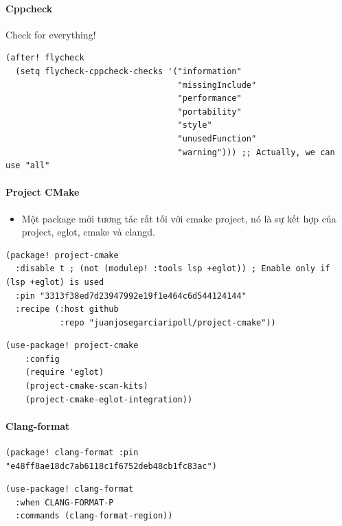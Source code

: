 \documentclass[11pt]{article}
\begin{document}
\paragraph{Cppcheck}
\label{sec:orge24f485}
Check for everything!

\begin{verbatim}
(after! flycheck
  (setq flycheck-cppcheck-checks '("information"
                                   "missingInclude"
                                   "performance"
                                   "portability"
                                   "style"
                                   "unusedFunction"
                                   "warning"))) ;; Actually, we can use "all"
\end{verbatim}

\paragraph{Project CMake}
\label{sec:orge6f52c6}
\begin{itemize}
\item Một package mới tương tác rất tối với cmake project, nó là sự kết hợp của
project, eglot, cmake và clangd.
\end{itemize}

\begin{verbatim}
(package! project-cmake
  :disable t ; (not (modulep! :tools lsp +eglot)) ; Enable only if (lsp +eglot) is used
  :pin "3313f38ed7d23947992e19f1e464c6d544124144"
  :recipe (:host github
           :repo "juanjosegarciaripoll/project-cmake"))
\end{verbatim}

\begin{verbatim}
(use-package! project-cmake
    :config
    (require 'eglot)
    (project-cmake-scan-kits)
    (project-cmake-eglot-integration))
\end{verbatim}

\paragraph{Clang-format}
\label{sec:orgf4dcdde}

\begin{verbatim}
(package! clang-format :pin "e48ff8ae18dc7ab6118c1f6752deb48cb1fc83ac")
\end{verbatim}

\begin{verbatim}
(use-package! clang-format
  :when CLANG-FORMAT-P
  :commands (clang-format-region))
\end{verbatim}
\end{document}
